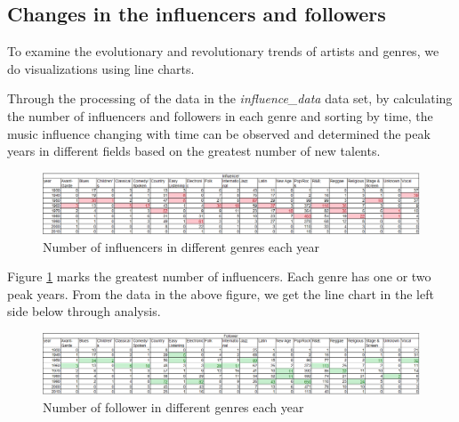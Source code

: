 \documentclass[12pt]{article}
\begin{document}
\subsection{Changes in the influencers and followers}
To examine the evolutionary and revolutionary trends of artists and genres, we do visualizations using line charts. 

Through the processing of the data in the \emph{influence\_data} data set, by calculating the number of influencers and followers in each genre and sorting by time, the music influence changing with time can be observed and determined the peak years in different fields based on the greatest number of new talents. 
\begin{figure}[H]
\label{fig:aa}
\small
\centering
\includegraphics[width=12cm]{figures/Q1_influencer_data.PNG}
\caption{Number of influencers in different genres each year}
\label{influencer data}
\end{figure}

Figure \ref{influencer data} marks the greatest number of influencers. Each genre has one or two peak years. From the data in the above figure, we get the line chart in the left side below through analysis.
\begin{figure}[H]
\label{fig:aa}
\small
\centering
\includegraphics[width=12cm]{figures/Q1_follower_data.png}
\caption{Number of follower in different genres each year}
\label{follower data}
\end{figure}
\end{document}
